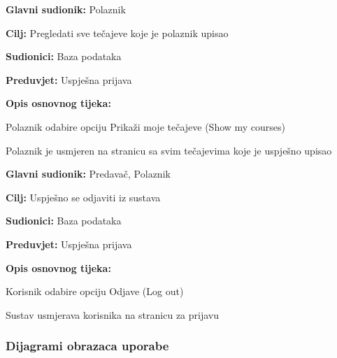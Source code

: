 			\noindent {}
			\begin{packed_item}
				
				\item \textbf{Glavni sudionik:} Polaznik
				\item  \textbf{Cilj:} Pregledati sve tečajeve koje je polaznik upisao
				\item  \textbf{Sudionici:} Baza podataka
				\item  \textbf{Preduvjet:} Uspješna prijava
				\item  \textbf{Opis osnovnog tijeka:}
				
				\item[] \begin{packed_enum}
					
					\item Polaznik odabire opciju Prikaži moje tečajeve (Show my courses)
					\item Polaznik je usmjeren na stranicu sa svim tečajevima koje je uspješno upisao
					
				\end{packed_enum}
				
				
			\end{packed_item}
			\noindent \underbar{\textbf{UC20 - Odjava}}
			\begin{packed_item}
				
				\item \textbf{Glavni sudionik:} Predavač, Polaznik
				\item  \textbf{Cilj:} Uspješno se odjaviti iz sustava
				\item  \textbf{Sudionici:} Baza podataka
				\item  \textbf{Preduvjet:} Uspješna prijava
				\item  \textbf{Opis osnovnog tijeka:}
				
				\item[] \begin{packed_enum}
					
					\item Korisnik odabire opciju Odjave (Log out)
					\item Sustav usmjerava korisnika na stranicu za prijavu
					
				\end{packed_enum}
				
				
			\end{packed_item}
			\eject
		
				\subsubsection{Dijagrami obrazaca uporabe}
					
